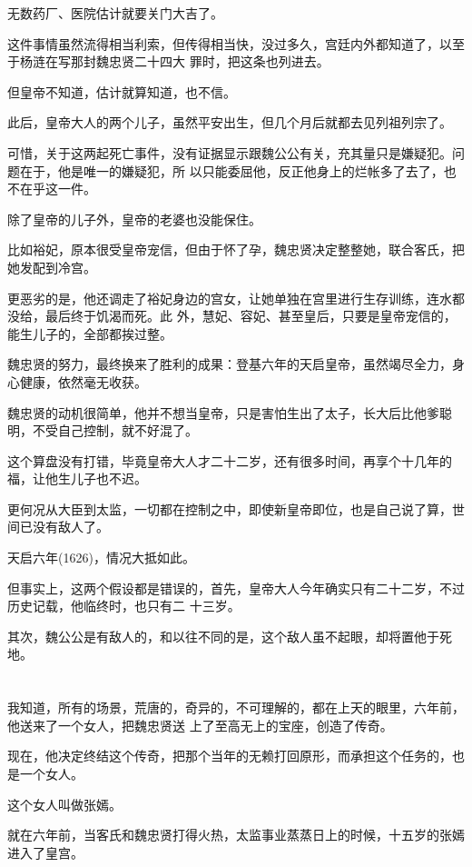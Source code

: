 \documentclass[11pt,a4paper,onecolumn]{article}
\begin{document}
无数药厂、医院估计就要关门大吉了。

这件事情虽然流得相当利索，但传得相当快，没过多久，宫廷内外都知道了，以至于杨涟在写那封魏忠贤二十四大
罪时，把这条也列进去。

但皇帝不知道，估计就算知道，也不信。

此后，皇帝大人的两个儿子，虽然平安出生，但几个月后就都去见列祖列宗了。

可惜，关于这两起死亡事件，没有证据显示跟魏公公有关，充其量只是嫌疑犯。问题在于，他是唯一的嫌疑犯，所
以只能委屈他，反正他身上的烂帐多了去了，也不在乎这一件。

除了皇帝的儿子外，皇帝的老婆也没能保住。

比如裕妃，原本很受皇帝宠信，但由于怀了孕，魏忠贤决定整整她，联合客氏，把她发配到冷宫。

更恶劣的是，他还调走了裕妃身边的宫女，让她单独在宫里进行生存训练，连水都没给，最后终于饥渴而死。此
外，慧妃、容妃、甚至皇后，只要是皇帝宠信的，能生儿子的，全部都挨过整。

魏忠贤的努力，最终换来了胜利的成果：登基六年的天启皇帝，虽然竭尽全力，身心健康，依然毫无收获。

魏忠贤的动机很简单，他并不想当皇帝，只是害怕生出了太子，长大后比他爹聪明，不受自己控制，就不好混了。

这个算盘没有打错，毕竟皇帝大人才二十二岁，还有很多时间，再享个十几年的福，让他生儿子也不迟。

更何况从大臣到太监，一切都在控制之中，即使新皇帝即位，也是自己说了算，世间已没有敌人了。

天启六年(1626)，情况大抵如此。

但事实上，这两个假设都是错误的，首先，皇帝大人今年确实只有二十二岁，不过历史记载，他临终时，也只有二
十三岁。

其次，魏公公是有敌人的，和以往不同的是，这个敌人虽不起眼，却将置他于死地。

\section[\thesection]{}

我知道，所有的场景，荒唐的，奇异的，不可理解的，都在上天的眼里，六年前，他送来了一个女人，把魏忠贤送
上了至高无上的宝座，创造了传奇。

现在，他决定终结这个传奇，把那个当年的无赖打回原形，而承担这个任务的，也是一个女人。

这个女人叫做张嫣。

就在六年前，当客氏和魏忠贤打得火热，太监事业蒸蒸日上的时候，十五岁的张嫣进入了皇宫。
\end{document}
